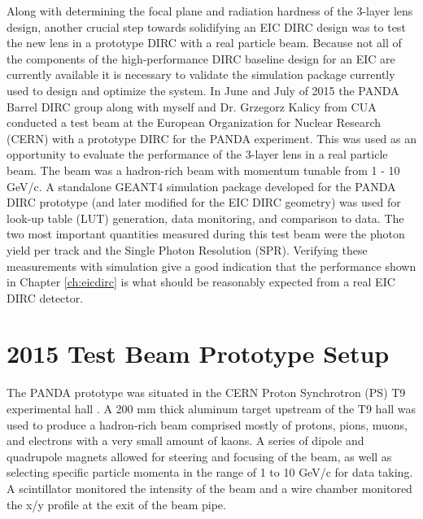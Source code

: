 \label{ch:analysis}

Along with determining the focal plane and radiation hardness of the 3-layer lens design, another crucial step towards solidifying an EIC DIRC design was to test the new lens in a prototype DIRC with a real particle beam. Because not all of the components of the high-performance DIRC baseline design for an EIC are currently available it is necessary to validate the simulation package currently used to design and optimize the system. In June and July of 2015 the PANDA Barrel DIRC group along with myself and Dr. Grzegorz Kalicy from CUA conducted a test beam at the European Organization for Nuclear Research (CERN) with a prototype DIRC for the PANDA experiment. This was used as an opportunity to evaluate the performance of the 3-layer lens in a real particle beam. The beam was a hadron-rich beam with momentum tunable from 1 - 10 GeV/c. A standalone GEANT4 simulation package developed for the PANDA DIRC prototype (and later modified for the EIC DIRC geometry) was used for look-up table (LUT) generation, data monitoring, and comparison to data.
The two most important quantities measured during this test beam were the photon yield per track and the Single Photon Resolution (SPR). Verifying these measurements with simulation give a good indication that the performance shown in Chapter \ref{ch:eicdirc} is what should be reasonably expected from a real EIC DIRC detector.

\section{2015 Test Beam Prototype Setup}
The PANDA prototype was situated in the CERN Proton Synchrotron (PS) T9 experimental hall \cite{CERN_T9}. A 200 mm thick aluminum target upstream of the T9 hall was used to produce a hadron-rich beam comprised mostly of protons, pions, muons, and electrons with a very small amount of kaons. A series of dipole and quadrupole magnets allowed for steering and focusing of the beam, as well as selecting specific particle momenta in the range of 1 to 10 GeV/c for data taking. A scintillator monitored the intensity of the beam and a wire chamber monitored the x/y profile at the exit of the beam pipe.

